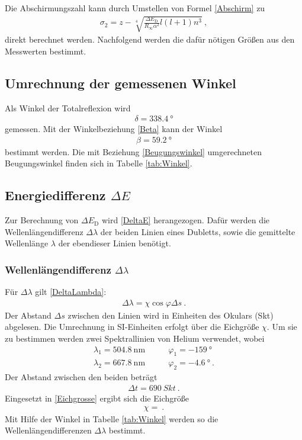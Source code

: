 Die Abschirmungszahl kann durch Umstellen von Formel \eqref{Abschirm} zu
\begin{align}
	\sigma_2 = z - \sqrt[4]{\frac{\Delta E_\text{D}}{R_\infty\alpha^2}l(l+1)n^3} \ ,
\end{align}
direkt berechnet werden. Nachfolgend werden die dafür nötigen Größen aus den Messwerten bestimmt.
\subsection{Umrechnung der gemessenen Winkel}
Als Winkel der Totalreflexion wird
\begin{align}
	\delta = \SI{338.4}{\degree}
\end{align}
gemessen. Mit der Winkelbeziehung \eqref{Beta} kann der Winkel
\begin{align}
	\beta = \SI{59.2}{\degree}
\end{align}
bestimmt werden. Die mit Beziehung \eqref{Beugungswinkel} umgerechneten Beugungswinkel finden sich in Tabelle \ref{tab:Winkel}.

\subsection{Energiedifferenz $\Delta E$}
Zur Berechnung von $\Delta E_\text{D}$ wird \eqref{DeltaE} herangezogen. Dafür werden die Wellenlängendifferenz $\Delta\lambda$ der beiden Linien eines Dubletts, sowie die gemittelte Wellenlänge $\lambda$ der ebendieser Linien benötigt.
\subsubsection{Wellenlängendifferenz $\Delta\lambda$}
Für $\Delta\lambda$ gilt \eqref{DeltaLambda}:
\begin{align}
	\Delta\lambda = \chi\cos\varphi\Delta s \ .
\end{align}
Der Abstand $\Delta s$ zwischen den Linien wird in Einheiten des Okulars  (\si{Skt}) abgelesen. Die Umrechnung in SI-Einheiten erfolgt über die Eichgröße $\chi$. Um sie zu bestimmen werden zwei Spektrallinien von Helium verwendet, wobei
\begin{align}
	\lambda_1 = \SI{504.8}{\nano\meter} \qquad& \varphi_1 = \SI{-159}{\degree} \\
	\lambda_2 = \SI{667.8}{\nano\meter} \qquad& \varphi_2 = \SI{-4.6}{\degree} \ .
\end{align}
Der Abstand zwischen den beiden beträgt
\begin{align}
	\Delta t = \SI{690}{Skt} \ .
\end{align}
Eingesetzt in \eqref{Eichgrosse} ergibt sich die Eichgröße
\begin{align}
	\chi =  \ .
\end{align}
Mit Hilfe der Winkel in Tabelle \ref{tab:Winkel} werden so die Wellenlängendifferenzen $\Delta\lambda$ bestimmt.
